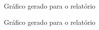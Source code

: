 \documentclass{article}
\begin{document}
\begin{figure}[h!]
\centering
{}
\caption{Gráfico gerado para o relatório}
\end{figure}

\newpage

\begin{figure}[h!]
\centering
{}
\caption{Gráfico gerado para o relatório}
\end{figure}

\newpage
\end{document}
